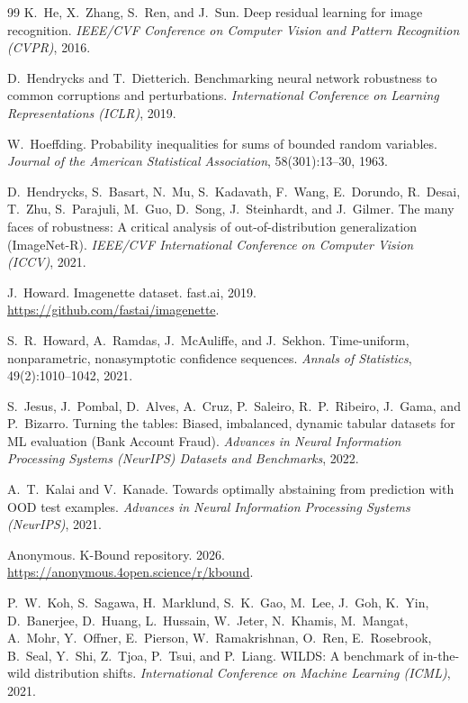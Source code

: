 \begin{thebibliography}{99}
K.~He, X.~Zhang, S.~Ren, and J.~Sun.
Deep residual learning for image recognition.
\textit{IEEE/CVF Conference on Computer Vision and Pattern Recognition (CVPR)}, 2016.

D.~Hendrycks and T.~Dietterich.
Benchmarking neural network robustness to common corruptions and
perturbations.
\textit{International Conference on Learning Representations (ICLR)}, 2019.

W.~Hoeffding.
Probability inequalities for sums of bounded random variables.
\textit{Journal of the American Statistical Association}, 58(301):13--30, 1963.

D.~Hendrycks, S.~Basart, N.~Mu, S.~Kadavath, F.~Wang, E.~Dorundo, R.~Desai,
T.~Zhu, S.~Parajuli, M.~Guo, D.~Song, J.~Steinhardt, and J.~Gilmer.
The many faces of robustness: A critical analysis of out-of-distribution
generalization (ImageNet-R).
\textit{IEEE/CVF International Conference on Computer Vision (ICCV)}, 2021.

J.~Howard.
Imagenette dataset.
fast.ai, 2019.
\url{https://github.com/fastai/imagenette}.

S.~R.~Howard, A.~Ramdas, J.~McAuliffe, and J.~Sekhon.
Time-uniform, nonparametric, nonasymptotic confidence sequences.
\textit{Annals of Statistics}, 49(2):1010--1042, 2021.

S.~Jesus, J.~Pombal, D.~Alves, A.~Cruz, P.~Saleiro, R.~P.~Ribeiro, J.~Gama,
and P.~Bizarro.
Turning the tables: Biased, imbalanced, dynamic tabular datasets for ML
evaluation (Bank Account Fraud).
\textit{Advances in Neural Information Processing Systems (NeurIPS) Datasets
and Benchmarks}, 2022.

A.~T.~Kalai and V.~Kanade.
Towards optimally abstaining from prediction with OOD test examples.
\textit{Advances in Neural Information Processing Systems (NeurIPS)}, 2021.

Anonymous.
K-Bound repository.
2026.
\url{https://anonymous.4open.science/r/kbound}.

P.~W.~Koh, S.~Sagawa, H.~Marklund, S.~K.~Gao, M.~Lee, J.~Goh, K.~Yin,
D.~Banerjee, D.~Huang, L.~Hussain, W.~Jeter, N.~Khamis, M.~Mangat,
A.~Mohr, Y.~Offner, E.~Pierson, W.~Ramakrishnan, O.~Ren, E.~Rosebrook,
B.~Seal, Y.~Shi, Z.~Tjoa, P.~Tsui, and P.~Liang.
WILDS: A benchmark of in-the-wild distribution shifts.
\textit{International Conference on Machine Learning (ICML)}, 2021.


\end{thebibliography}
